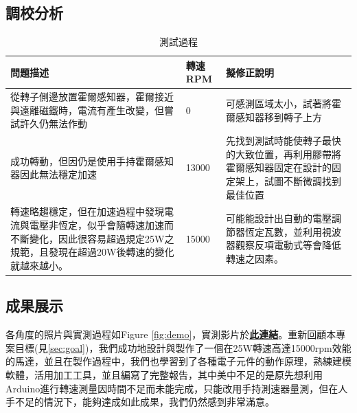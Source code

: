 \documentclass[12pt,a4paper]{article}
\begin{document}
\begin{CJK*}{UTF8}{bkai}
    \subsection{調校分析}
    \begin{table}[H]
        \centering
        \begin{tabularx}{\textwidth}{|X|l|X|}
            \hline
            問題描述                                                                         & 轉速RPM & 擬修正說明                                                \\
            \hline
            從轉子側邊放置霍爾感知器，霍爾接近與遠離磁鐵時，電流有產生改變，但嘗試許久仍無法作動                                   & 0     & 可感測區域太小，試著將霍爾感知器移到轉子上方                               \\
            \hline
            成功轉動，但因仍是使用手持霍爾感知器因此無法穩定加速                                                   & 13000 & 先找到測試時能使轉子最快的大致位置，再利用膠帶將霍爾感知器固定在設計的固定架上，試圖不斷微調找到最佳位置 \\
            \hline
            轉速略趨穩定，但在加速過程中發現電流與電壓非恆定，似乎會隨轉速加速而不斷變化，因此很容易超過規定25W之規範，且發現在超過20W後轉速的變化就越來越小。 & 15000 & 可能能設計出自動的電壓調節器恆定瓦數，並利用視波器觀察反項電動式等會降低轉速之因素。           \\
            \hline
        \end{tabularx}
        \caption{測試過程}
    \end{table}

    \newpage
    \subsection{成果展示}
    各角度的照片與實測過程如Figure \ref{fig:demo}，實測影片於\href{https://youtu.be/jbmlMec0Nww}{\textbf{此連結}}。重新回顧本專案目標(見\ref{sec:goal})，我們成功地設計與製作了一個在25W轉速高達15000rpm效能的馬達，並且在製作過程中，我們也學習到了各種電子元件的動作原理，熟練建模軟體，活用加工工具，並且編寫了完整報告，其中美中不足的是原先想利用Arduino進行轉速測量因時間不足而未能完成，只能改用手持測速器量測，但在人手不足的情況下，能夠達成如此成果，我們仍然感到非常滿意。


\end{CJK*}
\end{document}

